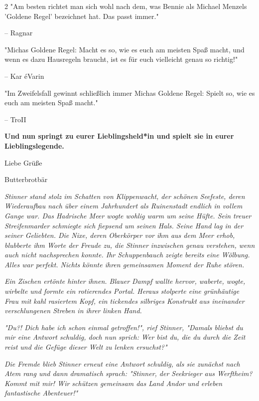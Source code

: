 \documentclass[10pt, a4paper, oneside]{book}
\newcommand{\fan}[1]{\textit{#1}}
\begin{document}
\begin{multicols*}{2}
"Am besten richtet man sich wohl nach dem, was Bennie als Michael Menzels
'Goldene Regel' bezeichnet hat. Das passt immer." 

– Ragnar
\supercite{47207}

\bigskip

"Michas Goldene Regel: Macht es so, wie es euch am meisten Spaß macht, und wenn es dazu Hausregeln braucht, ist es für euch vielleicht genau so richtig!" 

– Kar éVarin
\supercite{97401}

\bigskip

"Im Zweifelsfall gewinnt schließlich immer Michas Goldene Regel: Spielt so, wie es euch am meisten Spaß macht." 

– TroII
\supercite{118167}

\bigskip

\textbf{Und nun springt zu eurer Lieblingsheld*in und spielt sie in eurer Lieblingslegende.}\bigskip

Liebe Grüße

Butterbrotbär

\vspace*{\fill}
\columnbreak




\textit{\fan{Stinner stand stolz im Schatten von Klippenwacht, der schönen Seefeste, deren Wiederaufbau nach über einem Jahrhundert als Ruinenstadt endlich in vollem Gange war. Das Hadrische Meer wogte wohlig warm um seine Hüfte. Sein treuer Streifenmarder schmiegte sich fiepsend um seinen Hals. Seine Hand lag in der seiner Geliebten. Die Nixe, deren Oberkörper vor ihm aus dem Meer erhob, blubberte ihm Worte der Freude zu, die Stinner inzwischen genau verstehen, wenn auch nicht nachsprechen konnte. Ihr Schuppenbauch zeigte bereits eine Wölbung. Alles war perfekt. Nichts könnte ihren gemeinsamen Moment der Ruhe stören.}}

\textit{\fan{Ein Zischen ertönte hinter ihnen. Blauer Dampf wallte hervor, waberte, wogte, wirbelte und formte ein rotierendes Portal. Heraus stolperte eine grünhäutige Frau mit kahl rasiertem Kopf, ein tickendes silbriges Konstrukt aus ineinander verschlungenen Streben in ihrer linken Hand.}}

\textit{\fan{"Du?! Dich habe ich schon einmal getroffen!", rief Stinner, "Damals bliebst du mir eine Antwort schuldig, doch nun sprich: Wer bist du, die du durch die Zeit reist und die Gefüge dieser Welt zu lenken ersuchst?"}}

\textit{\fan{Die Fremde blieb Stinner erneut eine Antwort schuldig, als sie zunächst nach Atem rang und dann dramatisch sprach: "Stinner, der Seekrieger aus Werftheim? Kommt mit mir! Wir schützen gemeinsam das Land Andor und erleben fantastische Abenteuer!"}}


\end{multicols*}
\end{document}
